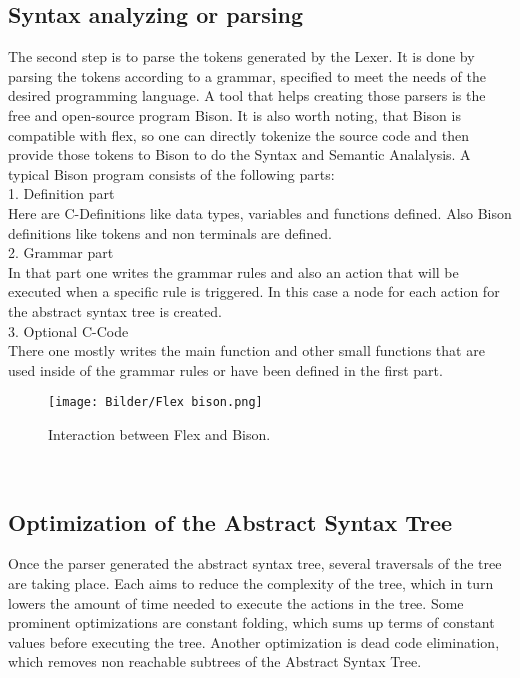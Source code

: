 \documentclass[a4paper, 11pt]{article}
\begin{document}
\subsection{Syntax analyzing or parsing}
The second step is to parse the tokens generated by the Lexer. It is done by parsing the tokens according to a grammar, specified to meet the needs of the desired programming language. A tool that helps creating those parsers is the free and open-source program Bison. It is also worth noting, that Bison is compatible with flex, so one can directly tokenize the source code and then provide those tokens to Bison to do the Syntax and Semantic Analalysis. A typical Bison program consists of the following parts: \\
1. Definition part\\
Here are C-Definitions like data types, variables and functions defined. Also Bison definitions like tokens and non terminals are defined.\\
2. Grammar part\\
In that part one writes the grammar rules and also an action that will be executed when a specific rule is triggered. In this case a node for each action for the abstract syntax tree is created.\\
3. Optional C-Code\\
There one mostly writes the main function and other small functions that are used inside of the grammar rules or have been defined in the first part.\\
\begin{figure} [h]
\begin{center}
\centering
\texttt{[image: Bilder/Flex bison.png]}
\caption{Interaction between Flex and Bison.}
\label{AST}
\end{center}
\end{figure}\\
\subsection{Optimization of the Abstract Syntax Tree}
Once the parser generated the abstract syntax tree, several traversals of the tree are taking place. Each aims to reduce the complexity of the tree, which in turn lowers the amount of time needed to execute the actions in the tree. Some prominent optimizations are constant folding, which sums up terms of constant values before executing the tree. Another optimization is dead code elimination, which removes non reachable subtrees of the Abstract Syntax Tree.
\end{document}
